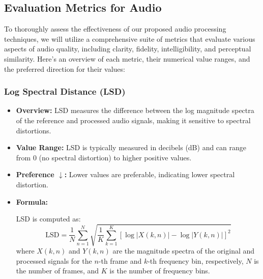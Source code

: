 \documentclass{ioereport}
\begin{document}
\subsection{Evaluation Metrics for Audio}
To thoroughly assess the effectiveness of our proposed audio processing techniques, we will utilize a comprehensive suite of metrics that evaluate various aspects of audio quality, including clarity, fidelity, intelligibility, and perceptual similarity. Here's an overview of each metric, their numerical value ranges, and the preferred direction for their values:

\subsubsection{Log Spectral Distance (LSD)}
\begin{itemize}
    \item \textbf{Overview:} LSD measures the difference between the log magnitude spectra of the reference and processed audio signals, making it sensitive to spectral distortions.
    
    \item \textbf{Value Range:} LSD is typically measured in decibels (dB) and can range from 0 (no spectral distortion) to higher positive values.
    
    \item \textbf{Preference $\downarrow$:} Lower values are preferable, indicating lower spectral distortion.
    
    \item \textbf{Formula:}
    
    LSD is computed as:
    \begin{equation}
        \text{LSD} = \frac{1}{N} \sum_{n=1}^{N} \sqrt{\frac{1}{K} \sum_{k=1}^{K} \left[ \log |X(k,n)| - \log |Y(k,n)| \right]^2}
    \end{equation}
    where \( X(k,n) \) and \( Y(k,n) \) are the magnitude spectra of the original and processed signals for the \( n \)-th frame and \( k \)-th frequency bin, respectively, \( N \) is the number of frames, and \( K \) is the number of frequency bins.
\end{itemize}
\end{document}
